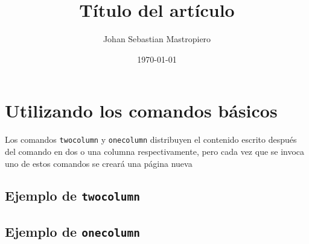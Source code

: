 \documentclass{article}
\title{Título del artículo}
\author{Johan Sebastian Mastropiero}
\date{\today}
\begin{document}
	\maketitle
	\begin{abstract}
		\lipsum[1]
	\end{abstract}
	
	\section{Utilizando los comandos básicos}
		Los comandos \texttt{twocolumn} y \texttt{onecolumn} distribuyen el contenido escrito después del comando en dos o una columna respectivamente, pero cada vez que se invoca uno de estos comandos se creará una página nueva
	
		\subsection{Ejemplo de \texttt{twocolumn}}
			\twocolumn
			\lipsum[1-4]
	
		\subsection{Ejemplo de \texttt{onecolumn}}
			\onecolumn
			\lipsum[2-3]
\end{document}
